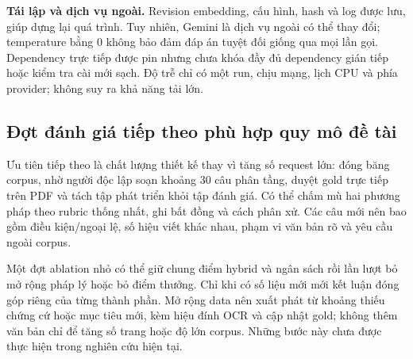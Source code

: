 \textbf{Tái lập và dịch vụ ngoài.} Revision embedding, cấu hình, hash và log được lưu, giúp dựng lại quá trình. Tuy nhiên, Gemini là dịch vụ ngoài có thể thay đổi; temperature bằng 0 không bảo đảm đáp án tuyệt đối giống qua mọi lần gọi. Dependency trực tiếp được pin nhưng chưa khóa đầy đủ dependency gián tiếp hoặc kiểm tra cài mới sạch. Độ trễ chỉ có một run, chịu mạng, lịch CPU và phía provider; không suy ra khả năng tải lớn.

\subsection{Đợt đánh giá tiếp theo phù hợp quy mô đề tài}
Ưu tiên tiếp theo là chất lượng thiết kế thay vì tăng số request lớn: đóng băng corpus, nhờ người độc lập soạn khoảng 30 câu phân tầng, duyệt gold trực tiếp trên PDF và tách tập phát triển khỏi tập đánh giá. Có thể chấm mù hai phương pháp theo rubric thống nhất, ghi bất đồng và cách phân xử. Các câu mới nên bao gồm điều kiện/ngoại lệ, số hiệu viết khác nhau, phạm vi văn bản rõ và yêu cầu ngoài corpus.

Một đợt ablation nhỏ có thể giữ chung điểm hybrid và ngân sách rồi lần lượt bỏ mở rộng pháp lý hoặc bỏ điểm thưởng. Chỉ khi có số liệu mới mới kết luận đóng góp riêng của từng thành phần. Mở rộng data nên xuất phát từ khoảng thiếu chứng cứ hoặc mục tiêu mới, kèm hiệu đính OCR và cập nhật gold; không thêm văn bản chỉ để tăng số trang hoặc độ lớn corpus. Những bước này chưa được thực hiện trong nghiên cứu hiện tại.
